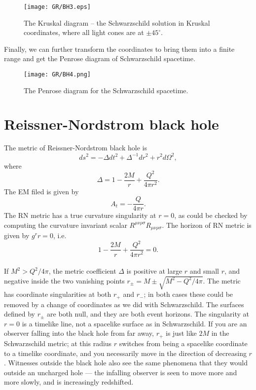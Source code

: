 \documentclass[cyan]{elegantnote}
\begin{document}
\begin{figure}[!htb]
\centering
\texttt{[image: GR/BH3.eps]}
\caption{The Kruskal diagram -- the Schwarzschild solution in Kruskal coordinates, where all light cones are at $\pm 45^{\circ}$.}
\end{figure}

\noindent
Finally, we can further transform the coordinates to bring them into a finite range and get the Penrose diagram of Schwarzschild spacetime.

\begin{figure}[!htb]
\centering
\texttt{[image: GR/BH4.png]}
\caption{The Penrose diagram for the Schwarzschild spacetime.}
\end{figure}

\section{Reissner-Nordstrom black hole}
The metric of Reissner-Nordstrom black hole is
\[ds^2 = -\Delta dt^2 + \Delta^{-1}dr^2 + r^2d\Omega^2,\]
where
\[\Delta = 1 - \frac{2M}{r} + \frac{Q^2}{4 \pi r^2}.\]
The EM filed is given by
\[A_{t} = -\frac{Q}{4\pi r}.\]
The RN metric has a true curvature singularity at $r = 0$, as could be checked by computing the curvature invariant scalar $R^{\mu\nu\rho\sigma}R_{\mu\nu\rho\sigma}$. 
The horizon of RN metric is given by $g^{r}{r} = 0$, i.e.
\[1 - \frac{2M}{r} + \frac{Q^2}{4 \pi r^2} = 0.\]
\\
If $M^2 > Q^2 / 4 \pi$, the metric coefficient $\Delta$ is positive at large $r$ and small $r$, and negative inside the two vanishing points $r_{\pm} = M \pm \sqrt{M^2 - Q^2 / 4 \pi}$. 
The metric has coordinate singularities at both $r_{+}$ and $r_{-}$; in both cases these could be removed by a change of coordinates as we did with Schwarzschild.
The surfaces defined by $r_{\pm}$ are both null, and they are both event horizons. 
The singularity at $r = 0$ is a timelike line, not a spacelike surface as in Schwarzschild. 
If you are an observer falling into the black hole from far away, $r_{+}$ is just like $2M$ in the Schwarzschild metric; at this radius $r$ switches from being a spacelike coordinate to a timelike coordinate, and you necessarily move in the direction of decreasing $r$. 
Witnesses outside the black hole also see the same phenomena that they would outside an uncharged hole --- the infalling observer is seen to move more and more slowly, and is increasingly redshifted.
\\ \\
\end{document}
